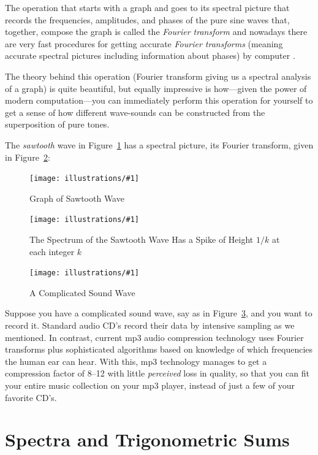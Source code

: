 \documentclass[openany]{book}
\newcommand{\ill}[3]{%
   \begin{figure}[H]%
   \vspace{-2ex}
   \centering%
   \texttt{[image: illustrations/\#1]}%
   \caption{#3}%
   \vspace{-2ex}
    \end{figure}}
\theoremstyle{plain}
\theoremstyle{definition}
\begin{document}
{{The operation that starts with a graph and goes to its spectral
picture that records the frequencies, amplitudes, and phases of the
pure sine waves that, together, compose the graph is called the {\em
  Fourier transform} and nowadays there are very fast procedures for
getting accurate {\em Fourier transforms} (meaning accurate spectral
pictures including information about phases) by
computer .


The theory behind this operation (Fourier transform giving
us a spectral analysis of a graph) is quite beautiful, but equally
impressive is how---given the power of modern computation---you can
immediately perform this operation for yourself to get a sense of how
different wave-sounds can be constructed from the superposition of
pure tones.

The {\em sawtooth} wave in Figure~\ref{fig:sawtooth} has a spectral picture, its Fourier transform, given in Figure~\ref{fig:sawtooth-spectrum}:

   \ill{sawtooth}{.7}{Graph of Sawtooth Wave\label{fig:sawtooth}}
   \ill{sawtooth-spectrum}{.6}{The Spectrum of the Sawtooth Wave Has a Spike of Height $1/k$ at
each integer $k$\label{fig:sawtooth-spectrum}}



 \ill{complicated-wave}{.6}{A Complicated Sound Wave\label{fig:complicated-wave}}

Suppose you have a complicated sound wave, say as in
Figure~\ref{fig:complicated-wave}, and you want to record it.
Standard audio CD's record their data by intensive sampling as we
mentioned. In contrast, current mp3 audio compression technology uses
Fourier transforms plus sophisticated algorithms based on
knowledge of which frequencies the human ear can hear.
With this, mp3 technology manages to
get a compression factor of 8--12 with little {\em perceived} loss in
quality, so that you can fit your entire music collection on your
mp3 player, instead of just a few of your favorite CD's.


 \chapter{Spectra and Trigonometric Sums \label{sec:trigsums}}

}}
\end{document}
